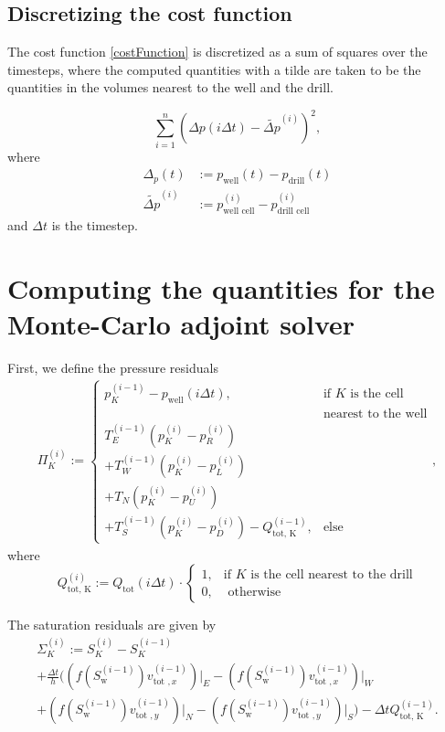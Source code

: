 \documentclass[conference]{IEEEtran}
\begin{document}
\subsection{Discretizing the cost function}
The cost function \eqref{costFunction} is discretized as a sum of squares over the timesteps, where the computed quantities with a tilde are taken to be the quantities in the volumes nearest to the well and the drill.

\begin{equation}
\sum_{i=1}^{n} (\Delta p(i\Delta t) - \tilde{\Delta p}^{(i)})^2,
\end{equation}
where
\begin{align}
\Delta_p(t) &:= p_\text{well}(t) - p_\text{drill}(t) \\
\tilde{\Delta p}^{(i)} &:= p_\text{well cell}^{(i)} - p_\text{drill cell}^{(i)}
\end{align}
and $\Delta t$ is the timestep.

\section{Computing the quantities for the Monte-Carlo adjoint solver}

First, we define the pressure residuals
\begin{multline}
\Pi_K^{(i)} := \begin{cases} p_K^{(i-1)} - p_\text{well}(i\Delta t), & \text{if } K \text{ is the cell}\\&\text{nearest to the well}\\T_E^{(i-1)} (p_K^{(i)} - p_R^{(i)}) \\+ T_W^{(i-1)} (p_K^{(i)} - p_L^{(i)}) \\+ T_N ( p_K^{(i)} - p_U^{(i)}) \\+ T_S^{(i-1)} (p_K^{(i)} - p_D^{(i)}) - Q_\text{tot, K}^{(i-1)}, & \text{else}\end{cases}, 
\end{multline}
where
\begin{equation}
Q_\text{tot, K}^{(i)} := Q_\text{tot}(i\Delta t) \cdot \begin{cases} 1, &\text{if } K \text{ is the cell nearest to the drill}\\0, &\text{ otherwise} \end{cases}
\end{equation}

The saturation residuals are given by
\begin{multline}
\Sigma_K^{(i)} := S_K^{(i)} - S_K^{(i-1)} \\+ \frac{\Delta t}{h} \biggr((f(S_\text{w}^{(i-1)})v_{\text{tot }, x}^{(i-1)})\lvert_E - (f(S_\text{w}^{(i-1)})v_{\text{tot }, x}^{(i-1)})\lvert_W \\+ (f(S_\text{w}^{(i-1)})v_{\text{tot }, y}^{(i-1)})\lvert_N - (f(S_\text{w}^{(i-1)})v_{\text{tot }, y}^{(i-1)})\lvert_S\biggr) - \Delta t Q_\text{tot, K}^{(i-1)}.
\end{multline}
\end{document}
